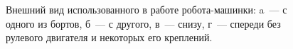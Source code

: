 \begin{figure}[h!]
    \begin{minipage}[h]{0.47\textwidth}
    \end{minipage}
    \hfill
    \begin{minipage}[h]{0.47\textwidth}
    \end{minipage}
    \vfill
    \begin{minipage}[h]{0.47\textwidth}
    \end{minipage}
    \hfill
    \begin{minipage}[h]{0.47\textwidth}
    \end{minipage}
    \vspace{0.5cm}
    \caption{Внешний вид использованного в работе робота-машинки: a~--- с одного из бортов, б~--- с другого, в~--- снизу, г~--- спереди без рулевого двигателя и некоторых его креплений.}
    \label{img_robot_gen_view}
\end{figure}

\newpage
\mbox{}
